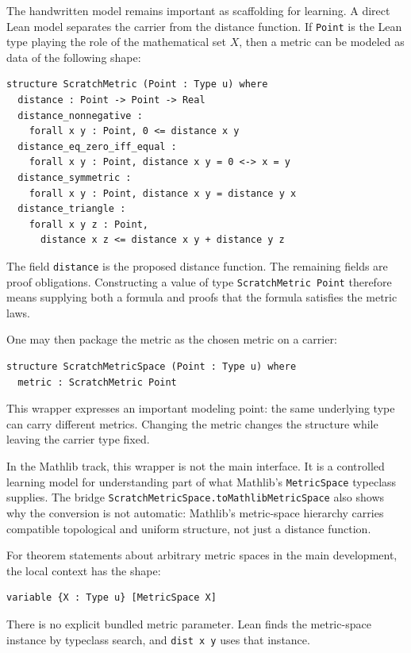 \begin{remark*}
The handwritten model remains important as scaffolding for learning. A direct
Lean model separates the carrier from the distance function. If
\texttt{Point} is the Lean type playing the role of the mathematical set \(X\),
then a metric can be modeled as data of the following shape:
\begin{verbatim}
structure ScratchMetric (Point : Type u) where
  distance : Point -> Point -> Real
  distance_nonnegative :
    forall x y : Point, 0 <= distance x y
  distance_eq_zero_iff_equal :
    forall x y : Point, distance x y = 0 <-> x = y
  distance_symmetric :
    forall x y : Point, distance x y = distance y x
  distance_triangle :
    forall x y z : Point,
      distance x z <= distance x y + distance y z
\end{verbatim}
The field \texttt{distance} is the proposed distance function. The remaining
fields are proof obligations. Constructing a value of type
\texttt{ScratchMetric Point} therefore means supplying both a formula and
proofs that the formula satisfies the metric laws.
\end{remark*}

\begin{remark*}
One may then package the metric as the chosen metric on a carrier:
\begin{verbatim}
structure ScratchMetricSpace (Point : Type u) where
  metric : ScratchMetric Point
\end{verbatim}
This wrapper expresses an important modeling point: the same underlying type
can carry different metrics. Changing the metric changes the structure while
leaving the carrier type fixed.

In the Mathlib track, this wrapper is not the main interface. It is a
controlled learning model for understanding part of what Mathlib's
\texttt{MetricSpace} typeclass supplies. The bridge
\texttt{ScratchMetricSpace.toMathlibMetricSpace} also shows why the conversion
is not automatic: Mathlib's metric-space hierarchy carries compatible
topological and uniform structure, not just a distance function.
\end{remark*}

\begin{remark*}
For theorem statements about arbitrary metric spaces in the main development,
the local context has the shape:
\begin{verbatim}
variable {X : Type u} [MetricSpace X]
\end{verbatim}
There is no explicit bundled metric parameter. Lean finds the metric-space
instance by typeclass search, and \texttt{dist x y} uses that instance.
\end{remark*}

